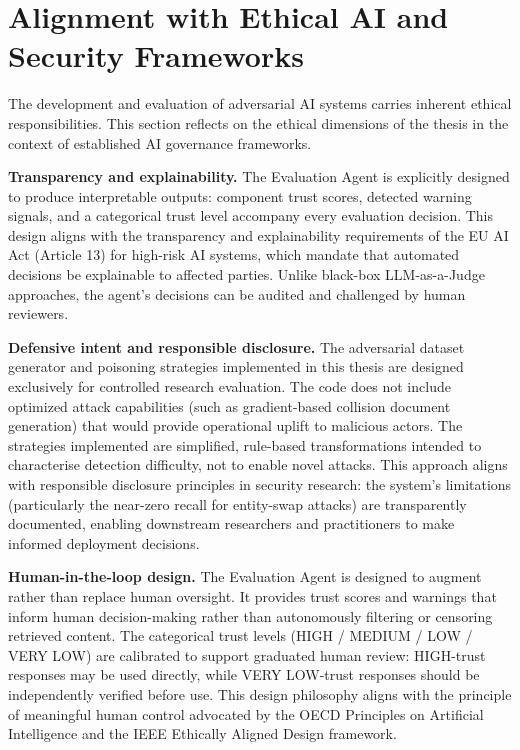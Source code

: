 \section{Alignment with Ethical AI and Security Frameworks}
\label{sec:disc_ethics}

The development and evaluation of adversarial AI systems carries inherent ethical responsibilities. This section reflects on the ethical dimensions of the thesis in the context of established AI governance frameworks.

\textbf{Transparency and explainability.} The Evaluation Agent is explicitly designed to produce interpretable outputs: component trust scores, detected warning signals, and a categorical trust level accompany every evaluation decision. This design aligns with the transparency and explainability requirements of the EU AI Act (Article 13) for high-risk AI systems, which mandate that automated decisions be explainable to affected parties. Unlike black-box LLM-as-a-Judge approaches, the agent's decisions can be audited and challenged by human reviewers.

\textbf{Defensive intent and responsible disclosure.} The adversarial dataset generator and poisoning strategies implemented in this thesis are designed exclusively for controlled research evaluation. The code does not include optimized attack capabilities (such as gradient-based collision document generation) that would provide operational uplift to malicious actors. The strategies implemented are simplified, rule-based transformations intended to characterise detection difficulty, not to enable novel attacks. This approach aligns with responsible disclosure principles in security research: the system's limitations (particularly the near-zero recall for entity-swap attacks) are transparently documented, enabling downstream researchers and practitioners to make informed deployment decisions.

\textbf{Human-in-the-loop design.} The Evaluation Agent is designed to augment rather than replace human oversight. It provides trust scores and warnings that inform human decision-making rather than autonomously filtering or censoring retrieved content. The categorical trust levels (HIGH / MEDIUM / LOW / VERY LOW) are calibrated to support graduated human review: HIGH-trust responses may be used directly, while VERY LOW-trust responses should be independently verified before use. This design philosophy aligns with the principle of meaningful human control advocated by the OECD Principles on Artificial Intelligence and the IEEE Ethically Aligned Design framework.

